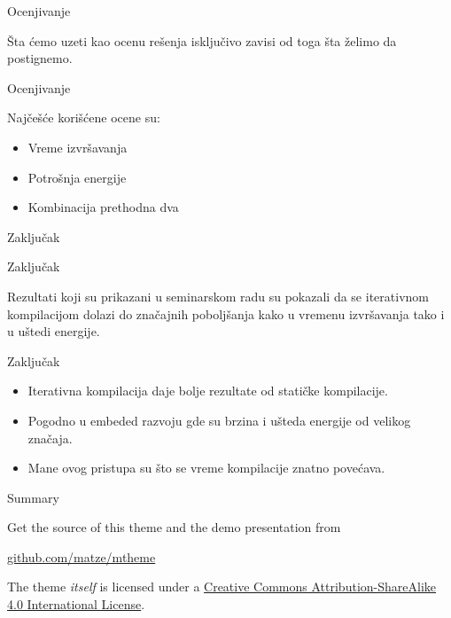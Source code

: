 \documentclass[10pt]{beamer}
\begin{document}
\begin{frame}{Ocenjivanje}

   Šta ćemo uzeti kao ocenu rešenja isključivo zavisi od toga šta želimo da postignemo.

\end{frame}

\begin{frame}{Ocenjivanje}

    Najčešće korišćene ocene su:
    \begin{itemize}
      \item Vreme izvršavanja
      \item Potrošnja energije
      \item Kombinacija prethodna dva
    \end{itemize}

\end{frame}

\begin{frame}[standout]
  Zaključak
\end{frame}

\begin{frame}{Zaključak}

  Rezultati koji su prikazani u seminarskom radu su
  pokazali da se iterativnom kompilacijom dolazi do 
  značajnih poboljšanja kako u vremenu izvršavanja tako i 
  u uštedi energije.

\end{frame}

\begin{frame}{Zaključak}

  \begin{itemize}[<+- | @alert->]
    \item Iterativna kompilacija daje bolje rezultate od statičke kompilacije.
    \item Pogodno u embeded razvoju gde su brzina i ušteda energije od velikog značaja.
    \item Mane ovog pristupa su što se vreme kompilacije znatno povećava.
  \end{itemize}

\end{frame}

\begin{frame}{Summary}

  Get the source of this theme and the demo presentation from

  \begin{center}\url{github.com/matze/mtheme}\end{center}

  The theme \emph{itself} is licensed under a
  \href{http://creativecommons.org/licenses/by-sa/4.0/}{Creative Commons
  Attribution-ShareAlike 4.0 International License}.

  \begin{center}\ccbysa\end{center}

\end{frame}
\end{document}
